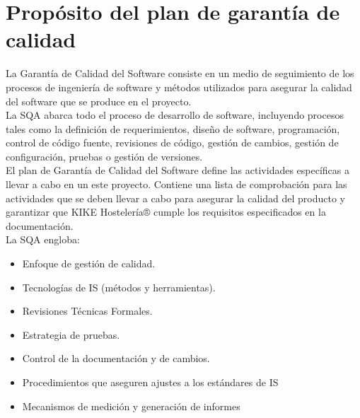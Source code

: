\documentclass[spanish,a4paper,11pt, twoside]{report}	%
\begin{document}
\newpage
\mbox{}
\thispagestyle{empty}						%
\newpage


\tableofcontents 							%

\newpage
\mbox{}
\thispagestyle{empty}						%
\newpage



\chapter{ Propósito del plan de garantía de calidad}

	
	 La Garantía de Calidad del Software consiste en un medio de seguimiento de los procesos de ingeniería de software y métodos utilizados para asegurar la calidad del software que se produce en el proyecto.\\
	
	La SQA abarca todo el proceso de desarrollo de software, incluyendo procesos tales como la definición de requerimientos, diseño de software, programación, control de código fuente, revisiones de código, gestión de cambios, gestión de configuración, pruebas o gestión de versiones.\\
	
	El plan de Garantía de Calidad del Software define las actividades específicas a llevar a cabo en un este proyecto. Contiene una lista de comprobación para las actividades que se deben llevar a cabo para asegurar la calidad del producto y garantizar que KIKE Hostelería® cumple los requisitos especificados en la documentación.\\
	La SQA engloba:

\begin{itemize}
	\item Enfoque de gestión de calidad.
	\item Tecnologías de IS (métodos y herramientas).
	\item Revisiones Técnicas Formales.
	\item Estrategia de pruebas.
	\item Control de la documentación y de cambios.
	\item Procedimientos que aseguren ajustes a los estándares de IS
	\item Mecanismos de medición y generación de informes
\end{itemize}	
\end{document}
